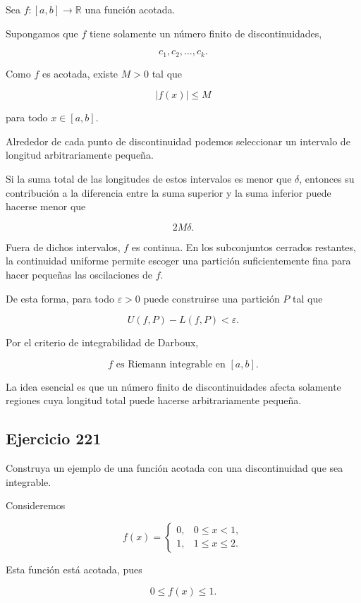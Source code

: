 \documentclass[12pt]{article}
\begin{document}
Sea \(f:[a,b]\to\mathbb{R}\) una función acotada.

Supongamos que \(f\) tiene solamente un número finito de
discontinuidades,

\[
c_1,c_2,\ldots,c_k.
\]

Como \(f\) es acotada, existe \(M>0\) tal que

\[
|f(x)|\leq M
\]

para todo \(x\in[a,b]\).

Alrededor de cada punto de discontinuidad podemos seleccionar un
intervalo de longitud arbitrariamente pequeña.

Si la suma total de las longitudes de estos intervalos es menor que
\(\delta\), entonces su contribución a la diferencia entre la suma
superior y la suma inferior puede hacerse menor que

\[
2M\delta.
\]

Fuera de dichos intervalos, \(f\) es continua. En los subconjuntos
cerrados restantes, la continuidad uniforme permite escoger una
partición suficientemente fina para hacer pequeñas las oscilaciones de
\(f\).

De esta forma, para todo \(\varepsilon>0\) puede construirse una
partición \(P\) tal que

\[
U(f,P)-L(f,P)<\varepsilon.
\]

Por el criterio de integrabilidad de Darboux,

\[
\boxed{
f \text{ es Riemann integrable en }[a,b]
}.
\]

La idea esencial es que un número finito de discontinuidades afecta
solamente regiones cuya longitud total puede hacerse arbitrariamente
pequeña.

\subsection*{Ejercicio 221}

Construya un ejemplo de una función acotada con una discontinuidad que
sea integrable.

Consideremos

\[
f(x)=
\begin{cases}
0, & 0\leq x<1,\\
1, & 1\leq x\leq2.
\end{cases}
\]

Esta función está acotada, pues

\[
0\leq f(x)\leq1.
\]
\end{document}
